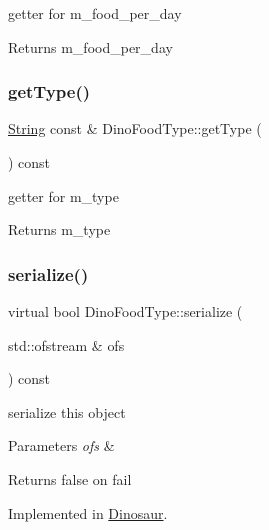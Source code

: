 getter for m\+\_\+food\+\_\+per\+\_\+day \begin{DoxyReturn}{Returns}
m\+\_\+food\+\_\+per\+\_\+day 
\end{DoxyReturn}
\mbox{\label{classDinoFoodType_ac03f15d756071438462663444e980b51}} 
\subsubsection{\texorpdfstring{get\+Type()}{getType()}}
{\footnotesize\ttfamily \hyperlink{classString}{String} const  \& Dino\+Food\+Type\+::get\+Type (\begin{DoxyParamCaption}{ }\end{DoxyParamCaption}) const}

getter for m\+\_\+type \begin{DoxyReturn}{Returns}
m\+\_\+type 
\end{DoxyReturn}
\mbox{\label{classDinoFoodType_a3654985e0619a24a19bda8280557651e}} 
\subsubsection{\texorpdfstring{serialize()}{serialize()}}
{\footnotesize\ttfamily virtual bool Dino\+Food\+Type\+::serialize (\begin{DoxyParamCaption}\item[{std\+::ofstream \&}]{ofs }\end{DoxyParamCaption}) const\hspace{0.3cm}{\ttfamily [pure virtual]}}

serialize this object 
\begin{DoxyParams}{Parameters}
{\em ofs} & \\
\hline
\end{DoxyParams}
\begin{DoxyReturn}{Returns}
false on fail 
\end{DoxyReturn}


Implemented in \hyperlink{classDinosaur_a9dc25dc1d834210d869641893695de22}{Dinosaur}.

\mbox{\label{classDinoFoodType_a35d060a217084fbb2effd3eea783c2be}} 
